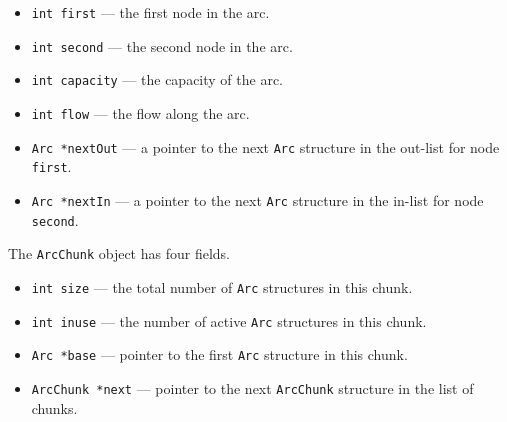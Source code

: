 \begin{itemize}
\item
{\tt int first} ---
the first node in the arc.
\item
{\tt int second} ---
the second node in the arc.
\item
{\tt int capacity} ---
the capacity of the arc.
\item
{\tt int flow} ---
the flow along the arc.
\item
{\tt Arc *nextOut} ---
a pointer to the next {\tt Arc} structure in the out-list for node
{\tt first}.
\item
{\tt Arc *nextIn} ---
a pointer to the next {\tt Arc} structure in the in-list for node
{\tt second}.
\end{itemize}
\par
The {\tt ArcChunk} object has four fields.
\begin{itemize}
\item
{\tt int size} ---
the total number of {\tt Arc} structures in this chunk.
\item
{\tt int inuse} ---
the number of active {\tt Arc} structures in this chunk.
\item
{\tt Arc *base} ---
pointer to the first {\tt Arc} structure in this chunk.
\item
{\tt ArcChunk *next} ---
pointer to the next {\tt ArcChunk} structure in the list of chunks.
\end{itemize}
